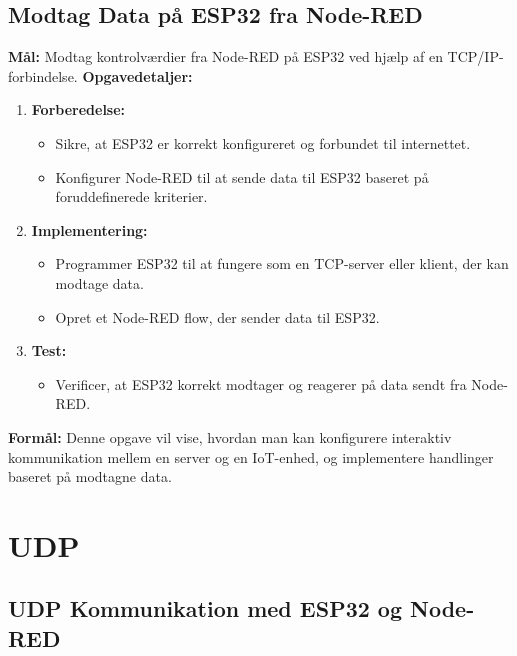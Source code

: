 \documentclass[12pt,a4paper]{book}
\begin{document}
	\subsection*{Modtag Data på ESP32 fra Node-RED}
	\textbf{Mål:} Modtag kontrolværdier fra Node-RED på ESP32 ved hjælp af en TCP/IP-forbindelse.
	\newline\newline\noindent
	\textbf{Opgavedetaljer:}
	\begin{enumerate}
		\item \textbf{Forberedelse:}
		\begin{itemize}
			\item Sikre, at ESP32 er korrekt konfigureret og forbundet til internettet.
			\item Konfigurer Node-RED til at sende data til ESP32 baseret på foruddefinerede kriterier.
		\end{itemize}
		\item \textbf{Implementering:}
		\begin{itemize}
			\item Programmer ESP32 til at fungere som en TCP-server eller klient, der kan modtage data.
			\item Opret et Node-RED flow, der sender data til ESP32.
		\end{itemize}
		\item \textbf{Test:}
		\begin{itemize}
			\item Verificer, at ESP32 korrekt modtager og reagerer på data sendt fra Node-RED.
		\end{itemize}
	\end{enumerate}
	\textbf{Formål:} Denne opgave vil vise, hvordan man kan konfigurere interaktiv kommunikation mellem en server og en IoT-enhed, og implementere handlinger baseret på modtagne data.
	
	\section{UDP}
	\subsection*{UDP Kommunikation med ESP32 og Node-RED}
\end{document}
